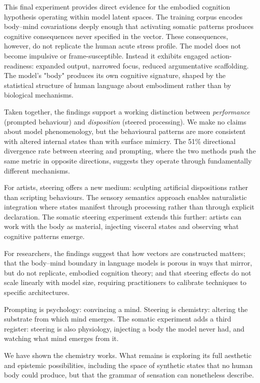 \documentclass[11pt,a4paper]{article}
\begin{document}
This final experiment provides direct evidence for the embodied cognition hypothesis operating within model latent spaces. The training corpus encodes body--mind covariations deeply enough that activating somatic patterns produces cognitive consequences never specified in the vector. These consequences, however, do not replicate the human acute stress profile. The model does not become impulsive or frame-susceptible. Instead it exhibits engaged action-readiness: expanded output, narrowed focus, reduced argumentative scaffolding. The model's "body" produces its own cognitive signature, shaped by the statistical structure of human language about embodiment rather than by biological mechanisms.

Taken together, the findings support a working distinction between \emph{performance} (prompted behaviour) and \emph{disposition} (steered processing). We make no claims about model phenomenology, but the behavioural patterns are more consistent with altered internal states than with surface mimicry. The 51\% directional divergence rate between steering and prompting, where the two methods push the same metric in opposite directions, suggests they operate through fundamentally different mechanisms.

For artists, steering offers a new medium: sculpting artificial dispositions rather than scripting behaviours. The sensory semantics approach enables naturalistic integration where states manifest through processing rather than through explicit declaration. The somatic steering experiment extends this further: artists can work with the body as material, injecting visceral states and observing what cognitive patterns emerge.

For researchers, the findings suggest that how vectors are constructed matters; that the body--mind boundary in language models is porous in ways that mirror, but do not replicate, embodied cognition theory; and that steering effects do not scale linearly with model size, requiring practitioners to calibrate techniques to specific architectures.

Prompting is psychology: convincing a mind. Steering is chemistry: altering the substrate from which mind emerges. The somatic experiment adds a third register: steering is also physiology, injecting a body the model never had, and watching what mind emerges from it.

We have shown the chemistry works. What remains is exploring its full aesthetic and epistemic possibilities, including the space of synthetic states that no human body could produce, but that the grammar of sensation can nonetheless describe.
\end{document}
